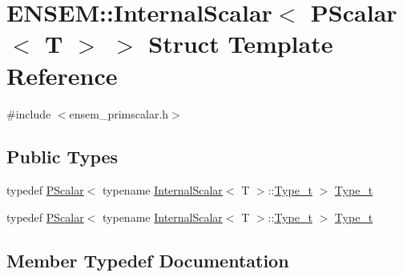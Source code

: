 \hypertarget{structENSEM_1_1InternalScalar_3_01PScalar_3_01T_01_4_01_4}{}\section{E\+N\+S\+EM\+:\+:Internal\+Scalar$<$ P\+Scalar$<$ T $>$ $>$ Struct Template Reference}
\label{structENSEM_1_1InternalScalar_3_01PScalar_3_01T_01_4_01_4}


{\ttfamily \#include $<$ensem\+\_\+primscalar.\+h$>$}

\subsection*{Public Types}
\begin{DoxyCompactItemize}
\item 
typedef \mbox{\hyperlink{classENSEM_1_1PScalar}{P\+Scalar}}$<$ typename \mbox{\hyperlink{structENSEM_1_1InternalScalar}{Internal\+Scalar}}$<$ T $>$\+::\mbox{\hyperlink{structENSEM_1_1InternalScalar_3_01PScalar_3_01T_01_4_01_4_a897c699063633ac7fc5b18fee8981b82}{Type\+\_\+t}} $>$ \mbox{\hyperlink{structENSEM_1_1InternalScalar_3_01PScalar_3_01T_01_4_01_4_a897c699063633ac7fc5b18fee8981b82}{Type\+\_\+t}}
\item 
typedef \mbox{\hyperlink{classENSEM_1_1PScalar}{P\+Scalar}}$<$ typename \mbox{\hyperlink{structENSEM_1_1InternalScalar}{Internal\+Scalar}}$<$ T $>$\+::\mbox{\hyperlink{structENSEM_1_1InternalScalar_3_01PScalar_3_01T_01_4_01_4_a897c699063633ac7fc5b18fee8981b82}{Type\+\_\+t}} $>$ \mbox{\hyperlink{structENSEM_1_1InternalScalar_3_01PScalar_3_01T_01_4_01_4_a897c699063633ac7fc5b18fee8981b82}{Type\+\_\+t}}
\end{DoxyCompactItemize}


\subsection{Member Typedef Documentation}
\mbox{\label{structENSEM_1_1InternalScalar_3_01PScalar_3_01T_01_4_01_4_a897c699063633ac7fc5b18fee8981b82}} 
